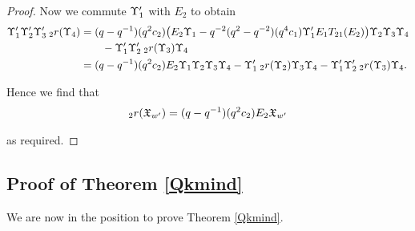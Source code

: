 \documentclass[a4 paper, 10pt]{article}
\begin{document}
\begin{proof}
Now we commute $\Upsilon^{\prime}_{1}$ with $E_2$ to obtain
	\begin{align*}
		\Upsilon^{\prime}_{1} \Upsilon^{\prime}_{2} \Upsilon^{\prime}_{3} \: {}_{2}r(\Upsilon_{4})
			&= ( q - q^{ -1 } )( q^{ 2 } c_2 ) \big( E_2 \Upsilon_{1} - q^{ -2 }( q^{ 2 } - q^{ -2 } )( q^{ 4 } c_1 )\Upsilon^{\prime}_{1} E_1 T_{21}(E_2) \big) \Upsilon_{2} \Upsilon_{3} \Upsilon_{4}\\
			&\qquad{} - \Upsilon^{\prime}_{1} \Upsilon^{\prime}_{2} \: {}_{2}r(\Upsilon_{3}) \Upsilon_{4}\\
			&= ( q - q^{ -1 } )( q^{ 2 } c_2 ) E_2 \Upsilon_{1} \Upsilon_{2} \Upsilon_{3} \Upsilon_{4} - \Upsilon^{\prime}_{1} \: {}_{2}r(\Upsilon_{2}) \Upsilon_{3} \Upsilon_{4} - \Upsilon^{\prime}_{1} \Upsilon^{\prime}_{2} \: {}_{2}r(\Upsilon_{3}) \Upsilon_{4}.
	\end{align*}
	
Hence we find that
	\begin{align*}
		{}_{2}r(\mathfrak{X}_{w^{\prime}}) = ( q - q^{ -1 } )( q^{ 2 } c_2 ) E_2 \mathfrak{X}_{w^{\prime}}
	\end{align*}

as required. 
\end{proof}


\subsection{Proof of Theorem \ref{Qkmind}}
We are now in the position to prove Theorem \ref{Qkmind}. 
\end{document}
